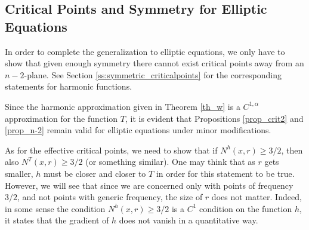 \documentclass[11pt]{article}
\begin{document}
\subsection{Critical Points and Symmetry for Elliptic Equations}\label{ss:critical_symmetry_elliptic}

In order to complete the generalization to elliptic equations, we only have to show that given enough symmetry there cannot exist critical points away from an $n-2$-plane.  See Section \ref{ss:symmetric_criticalpoints} for the corresponding statements for harmonic functions.

Since the harmonic approximation given in Theorem \ref{th_w} is a $C^{1,\alpha}$ approximation for the function $T$, it is evident that Propositions \ref{prop_crit2} and \ref{prop_n-2} remain valid for elliptic equations under minor modifications. 

As for the effective critical points, we need to show that if $N^h(x,r)\geq 3/2$, then also $N^T(x,r)\geq 3/2$ (or something similar). One may think that as $r$ gets smaller, $h$ must be closer and closer to $T$ in order for this statement to be true. However, we will see that since we are concerned only with points of frequency $3/2$, and not points with generic frequency, the size of $r$ does not matter. Indeed, in some sense the condition $N^h(x,r)\geq 3/2$ is a $C^1$ condition on the function $h$, it states that the gradient of $h$ does not vanish in a quantitative way.
\end{document}
